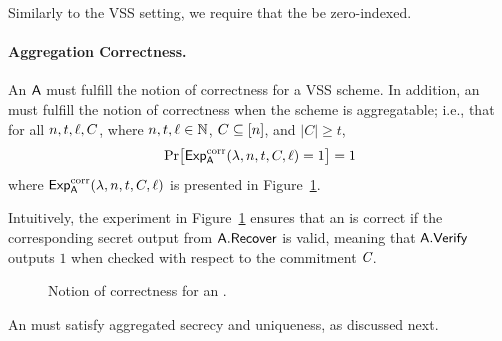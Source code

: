 \noindent
Similarly to the VSS setting, we require that the \AVSS be zero-indexed.

\medskip

\paragraph{Aggregation Correctness.}
An \AVSS $\mathsf{A}$ must fulfill the notion of correctness for a VSS scheme.
In addition,
an \AVSS must fulfill the notion of correctness when the scheme is aggregatable;
i.e., that for all $n, t, \mathsf{\ell},C$, where
$n,t,\mathsf{\ell} \in \mathbb{N}$, $C \subseteq [n]$, and $\lvert C \rvert \geq t$,
\[
  \Pr\bigl[\textsf{Exp}^{\textrm{corr}}_{\mathsf{A}}(\lambda,n,t,C,\mathsf{\ell}) = 1 \bigr] = 1
\]
where $\textsf{Exp}^{\textrm{corr}}_{\mathsf{A}}(\lambda,n,t,C,\mathsf{\ell})$ is presented in Figure~\ref{fg:avss-correctness}.

Intuitively, the experiment in Figure~\ref{fg:avss-correctness} ensures that an
\AVSS is correct if the corresponding secret output from $\mathsf{A}.\mathsf{Recover}$ is valid,
meaning that $\mathsf{A}.\mathsf{Verify}$ outputs $1$ when checked with respect to the \AVSS commitment $\textit{C}$.


\begin{figure}[t]
  \begin{pchstack}[boxed,center,space=1em]
\end{pchstack}
  \caption{Notion of correctness for an \AVSS.}
  \label{fg:avss-correctness}
\end{figure}



An \AVSS must satisfy
aggregated secrecy
and uniqueness,
as discussed next.




